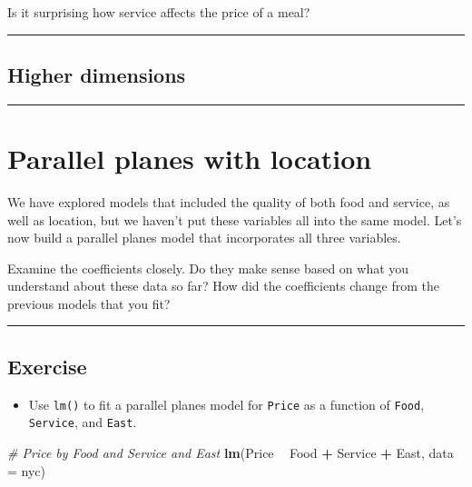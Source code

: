 \documentclass[
]{book}
\newenvironment{Shaded}{\begin{snugshade}}{\end{snugshade}}
\newcommand{\CommentTok}[1]{\textcolor[rgb]{0.56,0.35,0.01}{\textit{#1}}}
\newcommand{\DataTypeTok}[1]{\textcolor[rgb]{0.13,0.29,0.53}{#1}}
\newcommand{\KeywordTok}[1]{\textcolor[rgb]{0.13,0.29,0.53}{\textbf{#1}}}
\newcommand{\NormalTok}[1]{#1}
\newcommand{\OperatorTok}[1]{\textcolor[rgb]{0.81,0.36,0.00}{\textbf{#1}}}
\newcommand{\StringTok}[1]{\textcolor[rgb]{0.31,0.60,0.02}{#1}}
\providecommand{\tightlist}{%
  \setlength{\itemsep}{0pt}\setlength{\parskip}{0pt}}
\begin{document}
Is it surprising how service affects the price of a meal?

\begin{center}\rule{0.5\linewidth}{0.5pt}\end{center}

\hypertarget{higher-dimensions-1}{%
\subsection*{Higher dimensions}\label{higher-dimensions-1}}

\begin{center}\rule{0.5\linewidth}{0.5pt}\end{center}

\hypertarget{parallel-planes-with-location}{%
\section{Parallel planes with location}\label{parallel-planes-with-location}}

We have explored models that included the quality of both food and service, as well as location, but we haven't put these variables all into the same model. Let's now build a parallel planes model that incorporates all three variables.

Examine the coefficients closely. Do they make sense based on what you understand about these data so far? How did the coefficients change from the previous models that you fit?

\begin{center}\rule{0.5\linewidth}{0.5pt}\end{center}

\hypertarget{exercise-23}{%
\subsection*{Exercise}\label{exercise-23}}

\begin{itemize}
\tightlist
\item
  Use \texttt{lm()} to fit a parallel planes model for \texttt{Price} as a function of \texttt{Food}, \texttt{Service}, and \texttt{East}.
\end{itemize}

\begin{Shaded}
\begin{Highlighting}[]
\CommentTok{# Price by Food and Service and East}
\KeywordTok{lm}\NormalTok{(Price }\OperatorTok{~}\StringTok{ }\NormalTok{Food }\OperatorTok{+}\StringTok{ }\NormalTok{Service }\OperatorTok{+}\StringTok{ }\NormalTok{East, }\DataTypeTok{data =}\NormalTok{ nyc)}
\end{Highlighting}
\end{Shaded}
\end{document}
